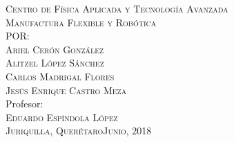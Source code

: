 \begin{titlepage}
\begin{center}
\begin{minipage}[c][9.5cm][s]{11cm}
\begin{center}
    {\scshape Centro de F\'isica Aplicada y Tecnolog\'ia Avanzada}\\ %
    \vspace{.3cm}
    \vspace{2.5cm}	
    {\Large \scshape Manufactura Flexible y Rob\'otica} %
    \vskip3cm
    \\[8pt] %
    POR:\\[5pt]
    {\Large \scshape Ariel Cer\'on Gonz\'alez}\\
    {\Large \scshape Alitzel L\'opez S\'anchez}\\
    {\Large \scshape Carlos Madrigal Flores}\\
    {\Large \scshape Jes\'us Enrique Castro Meza}\\
    \vspace{1.5cm}
    Profesor:\\
    {\large \scshape Eduardo Espíndola L\'opez\\}
    \vspace{0.5cm}
    \vspace{1cm}
    {\scshape Juriquilla, Quer\'etaro\hfill Junio, 2018}
  \end{center}
\end{minipage}

\end{center}
\null\vfill
\end{titlepage}